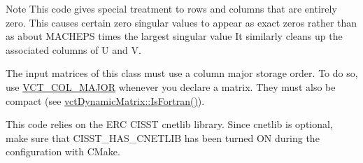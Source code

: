 \begin{DoxyNote}{Note}
This code gives special treatment to rows and columns that are entirely zero. This causes certain zero singular values to appear as exact zeros rather than as about M\-A\-C\-H\-E\-P\-S times the largest singular value It similarly cleans up the associated columns of U and V.

The input matrices of this class must use a column major storage order. To do so, use \hyperlink{vct_forward_declarations_8h_a432cdf8923afaf82f551450ad4034746}{V\-C\-T\-\_\-\-C\-O\-L\-\_\-\-M\-A\-J\-O\-R} whenever you declare a matrix. They must also be compact (see \hyperlink{classvct_dynamic_const_matrix_base_aac5f19015b4888f760f99daa4bac199c}{vct\-Dynamic\-Matrix\-::\-Is\-Fortran()}).

This code relies on the E\-R\-C C\-I\-S\-S\-T cnetlib library. Since cnetlib is optional, make sure that C\-I\-S\-S\-T\-\_\-\-H\-A\-S\-\_\-\-C\-N\-E\-T\-L\-I\-B has been turned O\-N during the configuration with C\-Make. 
\end{DoxyNote}



